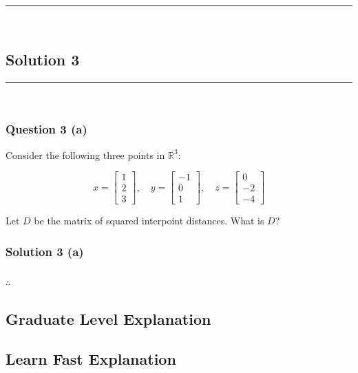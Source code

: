 \documentclass{article}
\begin{document}
\noindent\rule{\textwidth}{0.4pt}\\

\newpage

\subsection*{Solution 3}
\noindent\rule{\textwidth}{0.4pt}\\
\subsubsection*{Question 3 (a)}
\begin{flushleft}
    Consider the following three points in $\mathbb{R}^3$:

\[
x = \begin{bmatrix}1 \\ 2 \\ 3\end{bmatrix}, \quad
y = \begin{bmatrix}-1 \\ 0 \\ 1\end{bmatrix}, \quad
z = \begin{bmatrix}0 \\ -2 \\ -4\end{bmatrix}
\]

\end{flushleft}
\begin{flushleft}
    Let $D$ be the matrix of squared interpoint distances. What is $D$?
    
\end{flushleft}

\subsubsection*{Solution 3 (a)}


\subsubsection*{\normalfont}{$\therefore$ }

\subsection*{Graduate Level Explanation}

\subsection*{Learn Fast Explanation}
\end{document}
